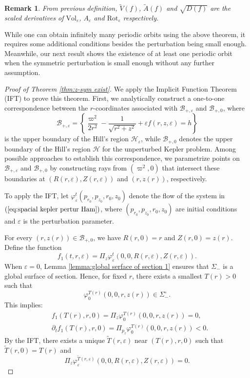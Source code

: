 \documentclass[11pt]{amsart}
\newcommand{\ep}{\varepsilon}
\newcommand{\om}{\varpi}
\newtheorem{remark}{Remark}[section]
\begin{document}
\begin{remark}
	From previous definition, $\tilde{V}(f)$, $\tilde{A}(f)$ and $\sqrt{D(f)}$ are the scaled derivatives of $\text{Vol}_\ep$, $A_\ep$ and $\text{Rot}_\ep$ respectively. 
\end{remark}
While one can obtain infinitely many periodic orbits using the above theorem, it requires some additional conditions besides the perturbation being small enough. Meanwhile, our next result shows the existence of at least one periodic orbit when the symmetric perturbation is small enough without any further assumption.

\begin{proof}[Proof of Theorem \ref{thm:z-sym exist}]

We apply the Implicit Function Theorem (IFT) to prove this theorem. First, we analytically construct a one-to-one correspondence between the $ r $-coordinates associated with $\mathcal{B}_{+,\ep}$ and $\mathcal{B}_{+,0}$, where  
$$
\mathcal{B}_{+,\ep} = \left\{ \frac{\om^2}{2r^2} - \frac{1}{\sqrt{r^2 + z^2}} + \ep f(r, z, \ep) = h \right\}
$$  
is the upper boundary of the Hill’s region $\mathcal{H}_\ep$, while $\mathcal{B}_{+,0}$ denotes the upper boundary of the Hill’s region $\mathcal{H}$ for the unperturbed Kepler problem. Among possible approaches to establish this correspondence, we parametrize points on $\mathcal{B}_{+,\ep}$ and $\mathcal{B}_{+,0}$ by constructing rays from $(\om^2, 0)$ that intersect these boundaries at $(R(r, \ep), Z(r, \ep))$ and $(r, z(r))$, respectively.  

To apply the IFT, let $\varphi^t_\ep( p_{r_0}, p_{z_0}, r_0, z_0)$ denote the flow of the system in $(\ref{eq:spacial kepler pertur Ham})$, where $(p_{r_0}, p_{z_0}, r_0, z_0)$ are initial conditions and $\ep$ is the perturbation parameter.  

For every $(r, z(r)) \in \mathcal{B}_{+,0}$, we have $R(r, 0) = r$ and $Z(r, 0) = z(r)$. Define the function  
$$
f_1(t, r, \ep) = \Pi_z\varphi^{t}_\ep( 0, 0, R(r, \ep), Z(r, \ep)).
$$ 
When $\ep = 0$, Lemma \ref{lemma:global serface of section 1} ensures that $\Sigma_{-}$ is a global surface of section. Hence, for fixed $r$, there exists a smallest $T(r) > 0$ such that  
$$
\varphi_0^{T(r)}( 0, 0, r, z(r)) \in \Sigma_{-}^\circ.
$$  
This implies:  
$$
\begin{aligned}
	&f_1(T(r), r, 0) = \Pi_z\varphi_0^{T(r)}( 0, 0, r, z(r)) = 0, \\
	&\partial_t f_1(T(r), r, 0) = \Pi_{p_z}\varphi_0^{T(r)}( 0, 0, r, z(r)) < 0.
\end{aligned}
$$  
By the IFT, there exists a unique $\tilde{T}(r, \ep)$ near $( T(r), r, 0)$ such that $\tilde{T}(r, 0) = T(r)$ and  
$$
\Pi_z\varphi_\ep^{\tilde{T}(r, \ep)}( 0, 0, R(r, \ep), Z(r, \ep)) = 0.
$$  


\end{proof}
\end{document}
